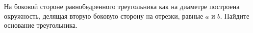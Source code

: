 \begin{ex}
	\begin{condition}
		На боковой стороне равнобедренного треугольника	как на диаметре построена окружность, делящая вторую боковую сторону на отрезки, равные \( a  \) и \( b \). Найдите основание треугольника.
	\end{condition}
\end{ex}